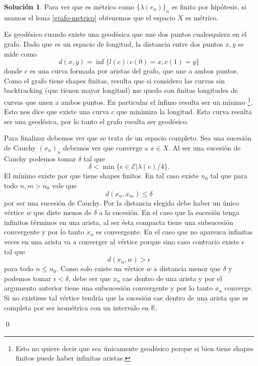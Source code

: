 \documentclass[11pt]{article}
\theoremstyle{plain}
\theoremstyle{definition}
\newtheorem*{sol}{Solución}
\theoremstyle{remark}
\newcommand\RR{\mathbb{R}}
\begin{document}
\begin{sol}
	
	Para ver que es métrico como $\{ \lambda(e_n) \}_n$ es finito por hipótesis, si usamos el lema \ref{grafo-metrico} obtenemos que el espacio $X$ es métrico.
	
	\medskip
	
	Es geodésico cuando existe una geodésica que une dos puntos cualesquiera en el grafo. Dado que es un espacio de longitud, la distancia entre dos puntos $x,y$ se mide como
	\[
	d(x,y) = \inf \{ l(c) : c(0)=x, c(1)=y \}
	\]
	donde $c$ es una curva formada por aristas del grafo, que une a ambos puntos. Como el grafo tiene shapes finitas, resulta que si considero las curvas sin backtracking (que tienen mayor longitud) me quedo con finitas longitudes de curvas que unen a ambos puntos. En particular el ínfimo resulta ser un mínimo \footnote{Esto no quiere decir que sea únicamente geodésico porque si bien tiene shapes finitos puede haber infinitas aristas.}. Esto nos dice que existe una curva $c$ que minimiza la longitud. Esta curva resulta ser una geodésica, por lo tanto el grafo resulta ser geodésico.
	
	\medskip
	
	Para finalizar debemos ver que se trata de un espacio completo. Sea una sucesión de Cauchy $(x_n)_n$ debemos ver que converge a $x \in X$. Al ser una sucesión de Cauchy podemos tomar $\delta$ tal que
	\[
	\delta < \min \{ e \in \mathcal E | \lambda(e)/4 \}.
	\]
	El mínimo existe por que tiene shapes finitos. En tal caso existe $n_0$ tal que para todo $n,m > n_0$ vale que 
	\[
	d(x_n, x_m) \le \delta
	\] 
	por ser una sucesión de Cauchy. Por la distancia elegida debe haber un único vértice $w$ que diste menos de $\delta$ a la sucesión. En el caso que la sucesión tenga infinitos términos en una arista, al ser ésta compacta tiene una subsucesión convergente y por lo tanto $x_n$ es convergente. En el caso que no aparezca infinitas veces en una arista va a converger al vértice porque sino caso contrario existe $\epsilon$ tal que
	\[
	d(x_n, w) > \epsilon
	\]
	para todo $n \le n_0$. Como solo existe un vértice $w$ a distancia menor que $\delta$ y podemos tomar $\epsilon < \delta$, debe ser que $x_n$ cae dentro de una arista y por el argumento anterior tiene una subsucesión convergente y por lo tanto $x_n$ converge. 
	Si no existiese tal vértice tendría que la sucesión cae dentro de una arista que es completa por ser isométrica con un intervalo en $\RR$.
	
	
	\qed
\end{sol}




	
\end{document}
